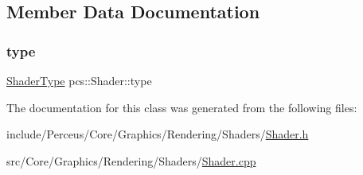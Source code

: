 \subsection{Member Data Documentation}
\mbox{\label{classpcs_1_1Shader_a0f8b1769a66ad5d63b4357287ff0f6f8}} 
\subsubsection{\texorpdfstring{type}{type}}
{\footnotesize\ttfamily \hyperlink{namespacepcs_a2f6dfe5fadf3611302a9b7259502c3c9}{Shader\+Type} pcs\+::\+Shader\+::type\hspace{0.3cm}{\ttfamily [private]}}



The documentation for this class was generated from the following files\+:\begin{DoxyCompactItemize}
\item 
include/\+Perceus/\+Core/\+Graphics/\+Rendering/\+Shaders/\hyperlink{Shader_8h}{Shader.\+h}\item 
src/\+Core/\+Graphics/\+Rendering/\+Shaders/\hyperlink{Shader_8cpp}{Shader.\+cpp}\end{DoxyCompactItemize}

